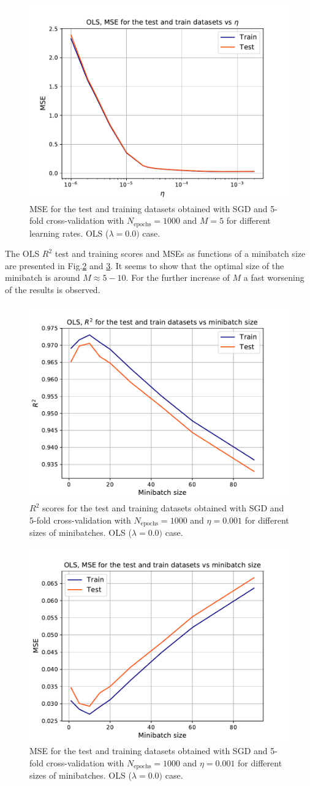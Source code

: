 \documentclass{emulateapj}
\begin{document}
\begin{figure}[h]
    \centering
    \includegraphics[width=.49\textwidth]{Figures/OLS_MSE_eta.pdf}
    \caption{MSE for the test and training datasets obtained with SGD and 5-fold cross-validation with $N_{\mathrm{epochs}}=1000$ and $M=5$ for different learning rates. OLS ($\lambda=0.0)$ case.}
    \label{fig: MSE_OLS_eta}
\end{figure}

The OLS $R^{2}$ test and training scores and MSEs as functions of a minibatch size are presented in Fig.\ref{fig: R2_OLS_minibatch} and \ref{fig: MSE_OLS_minibatch}. It seems to show that the optimal size of the minibatch is around $M\approx5-10$. For the further increase of $M$ a fast worsening of the results is observed. 

\begin{figure}[h]
    \centering
    \includegraphics[width=.49\textwidth]{Figures/OLS_R2_minibatch.pdf}
    \caption{$R^2$ scores for the test and training datasets obtained with SGD and 5-fold cross-validation with $N_{\mathrm{epochs}}=1000$ and $\eta=0.001$ for different sizes of minibatches. OLS ($\lambda=0.0)$ case.}
    \label{fig: R2_OLS_minibatch}
\end{figure}

\begin{figure}[h]
    \centering
    \includegraphics[width=.49\textwidth]{Figures/OLS_MSE_minibatch.pdf}
    \caption{MSE for the test and training datasets obtained with SGD and 5-fold cross-validation with $N_{\mathrm{epochs}}=1000$ and $\eta=0.001$ for different sizes of minibatches. OLS ($\lambda=0.0)$ case.}
    \label{fig: MSE_OLS_minibatch}
\end{figure}
\end{document}
